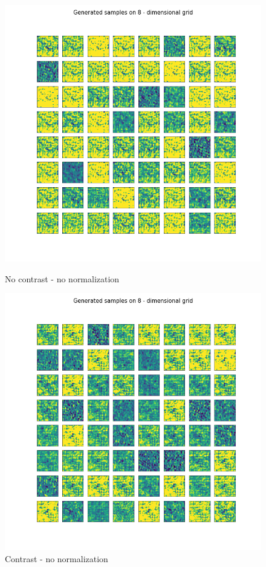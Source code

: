 \documentclass[12pt, english]{article}
\begin{document}
\begin{figure}[H] 
  \begin{minipage}{0.5\linewidth}
    \centering
    \includegraphics[width=.75\linewidth]{lvae2/21_DenseLadderVAE_noNorm-generated_samples.png} 
    \caption{No contrast - no normalization} 
    \label{fig:lvae-2-contrast-generated-1} 
  \end{minipage}%
  \begin{minipage}{0.5\linewidth}
    \centering
    \includegraphics[width=.75\linewidth]{lvae2/20_DenseLadderVAE_noNorm_contrat-generated_samples.png} 
    \caption{Contrast - no normalization} 
    \label{fig:lvae-2-contrast-generated-2} 
  \end{minipage} 
  \begin{minipage}{0.5\linewidth}

\end{minipage}
\end{figure}
\end{document}
